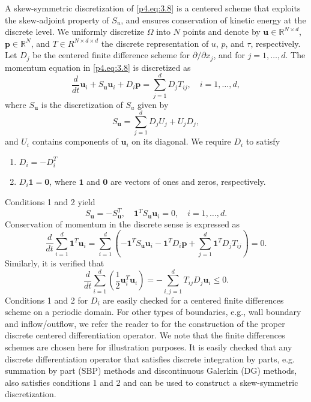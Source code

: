 A skew-symmetric discretization of \eqref{p4.eq:3.8} is a centered scheme that exploits the skew-adjoint property of $S_u$, and ensures conservation of kinetic energy at the discrete level. We uniformly discretize $\Omega$ into $N$ points and denote by $\mathbf u \in \mathbb R^{N\times d}$, $\mathbf p \in \mathbb R^N$, and $T \in R^{N\times d\times d} $ the discrete representation of $u$, $p$, and $\tau$, respectively. Let $D_j$ be the centered finite difference scheme for $\partial / \partial x_j$, and for $j = 1,\dots,d$. The momentum equation in \eqref{p4.eq:3.8} is discretized as
\begin{equation} \label{p4.eq:3.13}
	\frac{d}{dt}{\mathbf u}_i + S_{\mathbf u} \mathbf u_i + D_i \mathbf p = \sum_{j=1}^d D_j T_{ij}, \quad i=1,\dots,d,
\end{equation}
where $S_{\mathbf u}$ is the discretization of $S_{u}$ given by
\begin{equation} \label{p4.eq:3.14}
	S_{\mathbf u} = \sum_{j=1}^d D_j U_j + U_j D_j,
\end{equation}
and $U_i$ contains components of $\mathbf u_i$ on its diagonal. We require $D_i$ to satisfy
\begin{enumerate}[label={\arabic*.}]
	\item $D_i = -D_i^T$
	\item $D_i \mathbf 1 = \mathbf 0$, where $\mathbf 1$ and $\mathbf 0$ are vectors of ones and zeros, respectively.
\end{enumerate}
Conditions 1 and 2 yield
\begin{equation} \label{p4.eq:3.15}
	S_{\mathbf u} = -S_{\mathbf u}^T, \quad \mathbf 1^T S_{\mathbf u} \mathbf u_i = 0, \quad i=1,\dots,d.
\end{equation}
Conservation of momentum in the discrete sense is expressed as
\begin{equation} \label{p4.eq:3.16}
	\frac{d}{dt} \sum_{i=1}^d  \mathbf 1^T \mathbf u_i = \sum_{i=1}^d \left( - \mathbf 1^T S_{\mathbf u} \mathbf u_i - \mathbf 1^T D_i \mathbf p + \sum_{j=1}^d \mathbf 1^T D_j T_{ij}  \right) = 0.
\end{equation}
Similarly, it is verified that
\begin{equation} \label{p4.eq:3.17}
\frac{d}{dt} \sum_{i=1}^d \left( \frac 1 2 \mathbf u_i^T \mathbf u_i \right) = - \sum_{i,j=1}^d T_{ij}D_j \mathbf u_i \leq 0.
\end{equation}
Conditions 1 and 2 for $D_i$ are easily checked for a centered finite differences scheme on a periodic domain. For other types of boundaries, e.g., wall boundary and inflow/outflow, we refer the reader to \cite{morinishi1998fully,desjardins2008high} for the construction of the proper discrete centered differentiation operator. We note that the finite differences schemes are chosen here for illustration purposes. It is easily checked that any discrete differentiation operator that satisfies discrete integration by parts, e.g. summation by part (SBP) methods and discontinuous Galerkin (DG) methods, also satisfies conditions 1 and 2 and can be used to construct a skew-symmetric discretization.

